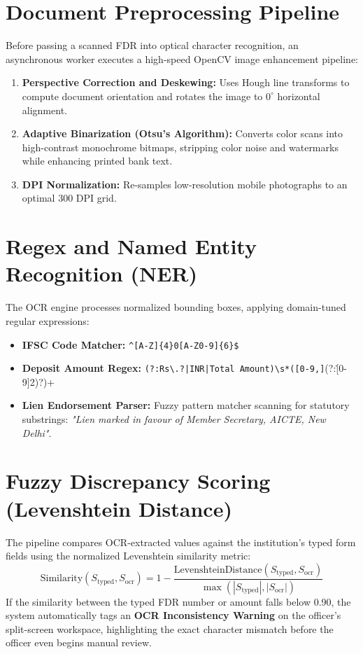 \documentclass[12pt, a4paper]{report}
\begin{document}
\section{Document Preprocessing Pipeline}

Before passing a scanned FDR into optical character recognition, an asynchronous worker executes a high-speed OpenCV image enhancement pipeline:
\begin{enumerate}[leftmargin=2em]
  \item \textbf{Perspective Correction and Deskewing:} Uses Hough line transforms to compute document orientation and rotates the image to $0^\circ$ horizontal alignment.
  \item \textbf{Adaptive Binarization (Otsu's Algorithm):} Converts color scans into high-contrast monochrome bitmaps, stripping color noise and watermarks while enhancing printed bank text.
  \item \textbf{DPI Normalization:} Re-samples low-resolution mobile photographs to an optimal 300 DPI grid.
\end{enumerate}

\section{Regex and Named Entity Recognition (NER)}

The OCR engine processes normalized bounding boxes, applying domain-tuned regular expressions:
\begin{itemize}[leftmargin=2em]
  \item \textbf{IFSC Code Matcher:} \verb|^[A-Z]{4}0[A-Z0-9]{6}$|
  \item \textbf{Deposit Amount Regex:} \verb+(?:Rs\.?|INR|Total Amount)\s*([0-9,]+(?:\.[0-9]{2})?)+
  \item \textbf{Lien Endorsement Parser:} Fuzzy pattern matcher scanning for statutory substrings: \textit{"Lien marked in favour of Member Secretary, AICTE, New Delhi"}.
\end{itemize}

\section{Fuzzy Discrepancy Scoring (Levenshtein Distance)}

The pipeline compares OCR-extracted values against the institution's typed form fields using the normalized Levenshtein similarity metric:
\begin{equation}
\text{Similarity}(S_{\text{typed}}, S_{\text{ocr}}) = 1 - \frac{\text{LevenshteinDistance}(S_{\text{typed}}, S_{\text{ocr}})}{\max(|S_{\text{typed}}|, |S_{\text{ocr}}|)}
\end{equation}
If the similarity between the typed FDR number or amount falls below 0.90, the system automatically tags an \textbf{OCR Inconsistency Warning} on the officer's split-screen workspace, highlighting the exact character mismatch before the officer even begins manual review.
\end{document}
